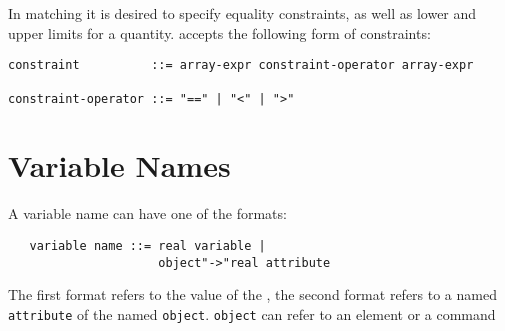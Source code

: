 In matching it is desired to specify equality constraints,
as well as lower and upper limits for a quantity.
\opal accepts the following form of constraints:
\begin{verbatim}
constraint          ::= array-expr constraint-operator array-expr

constraint-operator ::= "==" | "<" | ">"
\end{verbatim}

\section{Variable Names}
\label{sec:areference}
A variable name can have one of the formats:
\begin{verbatim}
   variable name ::= real variable |
                     object"->"real attribute
\end{verbatim}
The first format refers to the value of the
, 
the second format refers to a named \texttt{attribute} of the named
\texttt{object}. 
\texttt{object} can refer to an element or a command

